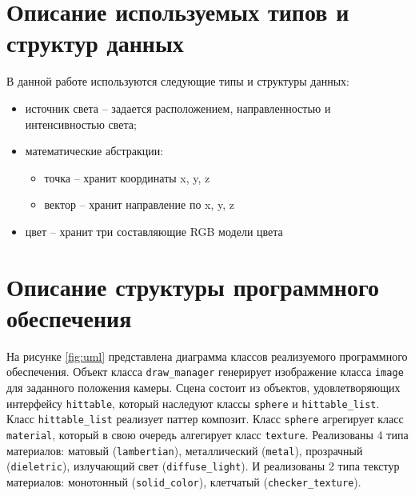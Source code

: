     \section{Описание используемых типов и структур данных}

        В данной работе используются следующие типы и структуры данных:
        
        \begin{itemize}
            \item источник света – задается расположением, направленностью и интенсивностью света;
            \item математические абстракции:
            \begin{itemize}
                \item точка -- хранит координаты x, y, z
                \item вектор -- хранит направление по x, y, z
            \end{itemize}
            \item цвет -- хранит три составляющие RGB модели цвета
        \end{itemize}

\clearpage

    \section{Описание структуры программного обеспечения}
    
            На рисунке \ref{fig:uml} представлена диаграмма классов реализуемого программного обеспечения. Объект класса \texttt{draw\_manager} генерирует изображение класса \texttt{image} для заданного положения камеры. Сцена состоит из объектов, удовлетворяющих интерфейсу \texttt{hittable}, который наследуют классы \texttt{sphere} и \texttt{hittable\_list}. Класс \texttt{hittable\_list} реализует паттер композит. Класс \texttt{sphere} агрегирует класс \texttt{material}, который в свою очередь алгегирует класс \texttt{texture}. Реализованы 4 типа материалов: матовый (\texttt{lambertian}), металлический (\texttt{metal}), прозрачный (\texttt{dieletric}), излучающий свет (\texttt{diffuse\_light}). И реализованы 2 типа текстур материалов: монотонный (\texttt{solid\_color}), клетчатый (\texttt{checker\_texture}).
        

